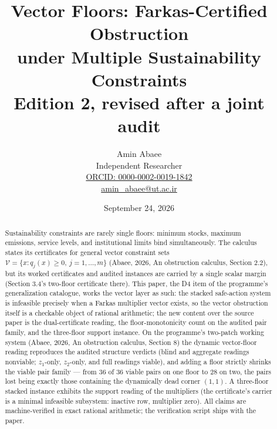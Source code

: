 \documentclass[10pt,twocolumn]{article}
\theoremstyle{definition}
\begin{document}
\title{Vector Floors: Farkas-Certified Obstruction\\ under Multiple Sustainability Constraints\\[0.2em]
{\large\rmfamily Edition 2, revised after a joint audit}}
\author{Amin Abaee\\[0.35em]
{\small Independent Researcher}\\[0.55em]
{\small\href{https://orcid.org/0000-0002-0019-1842}{ORCID: 0000-0002-0019-1842}}\\[0.3em]
{\small\href{mailto:amin\_abaee@ut.ac.ir}{amin\_abaee@ut.ac.ir}}}
\date{September 24, 2026}
\maketitle

\begin{abstract}
Sustainability constraints are rarely single floors: minimum stocks, maximum
emissions, service levels, and institutional limits bind simultaneously. The calculus states its certificates
for general vector constraint sets $\mathcal V=\{x: q_j(x)\ge 0,\
j=1,\dots,m\}$ (Abaee, 2026, An obstruction calculus, Section 2.2), but its worked certificates and
audited instances are carried by a single scalar margin (Section 3.4's
two-floor certificate there). This paper, the D4 item of the programme's
generalization catalogue, works the vector layer as such: the stacked
safe-action system is infeasible precisely when a Farkas multiplier vector
exists, so the vector obstruction itself is a checkable object of rational
arithmetic; the new content over the source paper is the dual-certificate
reading, the floor-monotonicity count on the audited pair family, and the
three-floor support instance. On the programme's two-patch working system
(Abaee, 2026, An obstruction calculus, Section 8) the dynamic vector-floor reading reproduces the
audited structure verdicts (blind and aggregate readings nonviable;
$z_1$-only, $z_2$-only, and full readings viable), and adding a floor
strictly shrinks the viable pair family --- from $36$ of $36$ viable pairs
on one floor to $28$ on two, the pairs lost being exactly those containing
the dynamically dead corner $(1,1)$. A three-floor stacked instance
exhibits the support reading of the multipliers (the certificate's carrier
is a minimal infeasible subsystem: inactive row, multiplier zero). All
claims are machine-verified in exact rational arithmetic; the verification
script ships with the paper.
\end{abstract}
\end{document}
